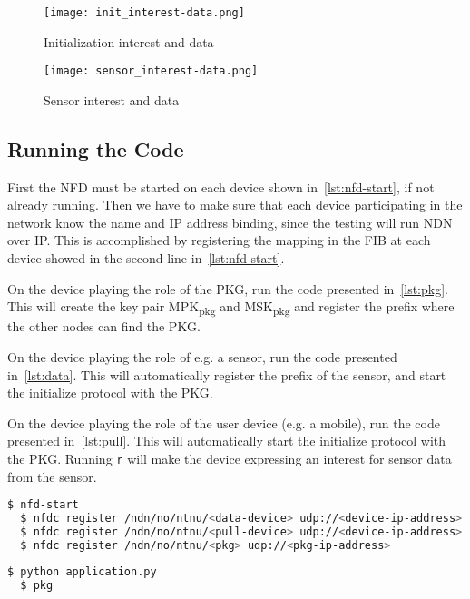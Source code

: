 \begin{figure}[ht]
  \centering
  \texttt{[image: init\_interest-data.png]}
  \caption{Initialization \gls{interest} and \gls{data}}
  \label{fig:init_interest-data}
\end{figure}

\begin{figure}[ht]
  \centering
  \texttt{[image: sensor\_interest-data.png]}
  \caption{Sensor \gls{interest} and \gls{data}}
  \label{fig:sensor_interest-data}
\end{figure}

\subsection{Running the Code}
First the \gls{NFD} must be started on each device shown in~\autoref{lst:nfd-start}, if not already running. 
Then we have to make sure that each device participating in the network know the \gls{name} and \gls{IP} address binding, since the testing will run \gls{NDN} over \gls{IP}.
This is accomplished by registering the mapping in the \gls{FIB} at each device showed in the second line in~\autoref{lst:nfd-start}.

On the device playing the role of the \gls{PKG}, run the code presented in~\autoref{lst:pkg}. 
This will create the key pair MPK\textsubscript{pkg} and MSK\textsubscript{pkg} and register the prefix where the other nodes can find the \gls{PKG}.

On the device playing the role of e.g. a sensor, run the code presented in~\autoref{lst:data}.
This will automatically register the prefix of the sensor, and start the initialize protocol with the \gls{PKG}.

On the device playing the role of the user device (e.g. a mobile), run the code presented in~\autoref{lst:pull}.
This will automatically start the initialize protocol with the \gls{PKG}.
Running \texttt{r} will make the device expressing an \gls{interest} for sensor \gls{data} from the sensor.

\begin{lstlisting}[language=bash, caption={NFD Start}, label={lst:nfd-start}]
  $ nfd-start
  $ nfdc register /ndn/no/ntnu/<data-device> udp://<device-ip-address>
  $ nfdc register /ndn/no/ntnu/<pull-device> udp://<device-ip-address>
  $ nfdc register /ndn/no/ntnu/<pkg> udp://<pkg-ip-address>
\end{lstlisting}

\begin{lstlisting}[language=bash, caption={Start PKG}, label={lst:pkg}]
  $ python application.py
  $ pkg
\end{lstlisting}

